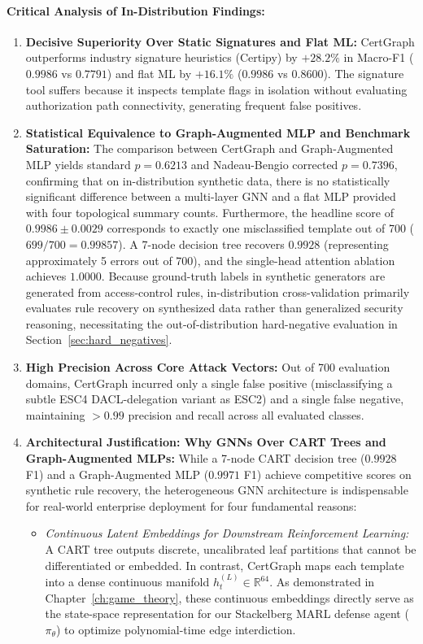 \paragraph{Critical Analysis of In-Distribution Findings:}
\begin{enumerate}
    \item \textbf{Decisive Superiority Over Static Signatures and Flat ML:} CertGraph outperforms industry signature heuristics (Certipy) by $+28.2\%$ in Macro-F1 ($0.9986$ vs $0.7791$) and flat ML by $+16.1\%$ ($0.9986$ vs $0.8600$). The signature tool suffers because it inspects template flags in isolation without evaluating authorization path connectivity, generating frequent false positives.
    \item \textbf{Statistical Equivalence to Graph-Augmented MLP and Benchmark Saturation:} The comparison between CertGraph and Graph-Augmented MLP yields standard $p = 0.6213$ and Nadeau-Bengio corrected $p = 0.7396$, confirming that on in-distribution synthetic data, there is no statistically significant difference between a multi-layer GNN and a flat MLP provided with four topological summary counts. Furthermore, the headline score of $0.9986 \pm 0.0029$ corresponds to exactly one misclassified template out of 700 ($699/700 = 0.99857$). A 7-node decision tree recovers $0.9928$ (representing approximately 5 errors out of 700), and the single-head attention ablation achieves $1.0000$. Because ground-truth labels in synthetic generators are generated from access-control rules, in-distribution cross-validation primarily evaluates rule recovery on synthesized data rather than generalized security reasoning, necessitating the out-of-distribution hard-negative evaluation in Section~\ref{sec:hard_negatives}.
    \item \textbf{High Precision Across Core Attack Vectors:} Out of 700 evaluation domains, CertGraph incurred only a single false positive (misclassifying a subtle ESC4 DACL-delegation variant as ESC2) and a single false negative, maintaining $>0.99$ precision and recall across all evaluated classes.
    \item \textbf{Architectural Justification: Why GNNs Over CART Trees and Graph-Augmented MLPs:} While a 7-node CART decision tree ($0.9928$ F1) and a Graph-Augmented MLP ($0.9971$ F1) achieve competitive scores on synthetic rule recovery, the heterogeneous GNN architecture is indispensable for real-world enterprise deployment for four fundamental reasons:
    \begin{itemize}
        \item \textit{Continuous Latent Embeddings for Downstream Reinforcement Learning:} A CART tree outputs discrete, uncalibrated leaf partitions that cannot be differentiated or embedded. In contrast, CertGraph maps each template into a dense continuous manifold $h_t^{(L)} \in \mathbb{R}^{64}$. As demonstrated in Chapter~\ref{ch:game_theory}, these continuous embeddings directly serve as the state-space representation for our Stackelberg MARL defense agent ($\pi_\theta$) to optimize polynomial-time edge interdiction.

\end{itemize}
\end{enumerate}
